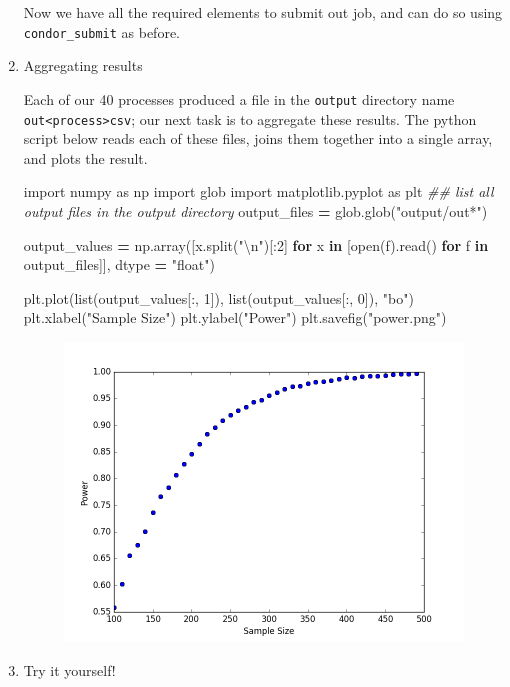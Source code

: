 \documentclass[]{book}
\newenvironment{Shaded}{\begin{snugshade}}{\end{snugshade}}
\newcommand{\KeywordTok}[1]{\textcolor[rgb]{0.13,0.29,0.53}{\textbf{#1}}}
\newcommand{\DecValTok}[1]{\textcolor[rgb]{0.00,0.00,0.81}{#1}}
\newcommand{\CharTok}[1]{\textcolor[rgb]{0.31,0.60,0.02}{#1}}
\newcommand{\StringTok}[1]{\textcolor[rgb]{0.31,0.60,0.02}{#1}}
\newcommand{\ImportTok}[1]{#1}
\newcommand{\CommentTok}[1]{\textcolor[rgb]{0.56,0.35,0.01}{\textit{#1}}}
\newcommand{\ControlFlowTok}[1]{\textcolor[rgb]{0.13,0.29,0.53}{\textbf{#1}}}
\newcommand{\OperatorTok}[1]{\textcolor[rgb]{0.81,0.36,0.00}{\textbf{#1}}}
\newcommand{\BuiltInTok}[1]{#1}
\newcommand{\NormalTok}[1]{#1}
\begin{document}
\begin{enumerate}
  Now we have all the required elements to submit out job, and can do so
  using \texttt{condor\_submit} as before.
\item
  Aggregating results

  Each of our 40 processes produced a file in the \texttt{output}
  directory name \texttt{out\textless{}process\textgreater{}csv}; our
  next task is to aggregate these results. The python script below reads
  each of these files, joins them together into a single array, and
  plots the result.

\begin{Shaded}
\begin{Highlighting}[]
\ImportTok{import}\NormalTok{ numpy }\ImportTok{as}\NormalTok{ np}
\ImportTok{import}\NormalTok{ glob}
\ImportTok{import}\NormalTok{ matplotlib.pyplot }\ImportTok{as}\NormalTok{ plt}
\CommentTok{## list all output files in the output directory}
\NormalTok{output_files }\OperatorTok{=}\NormalTok{ glob.glob(}\StringTok{"output/out*"}\NormalTok{)}

\NormalTok{output_values }\OperatorTok{=}\NormalTok{ np.array([x.split(}\StringTok{"}\CharTok{\textbackslash{}n}\StringTok{"}\NormalTok{)[:}\DecValTok{2}\NormalTok{]}
                          \ControlFlowTok{for}\NormalTok{ x }\KeywordTok{in}\NormalTok{ [}\BuiltInTok{open}\NormalTok{(f).read() }\ControlFlowTok{for}\NormalTok{ f }\KeywordTok{in}\NormalTok{ output_files]],}
\NormalTok{                         dtype }\OperatorTok{=} \StringTok{"float"}\NormalTok{)}

\NormalTok{plt.plot(}\BuiltInTok{list}\NormalTok{(output_values[:, }\DecValTok{1}\NormalTok{]), }\BuiltInTok{list}\NormalTok{(output_values[:, }\DecValTok{0}\NormalTok{]), }\StringTok{"bo"}\NormalTok{)}
\NormalTok{plt.xlabel(}\StringTok{"Sample Size"}\NormalTok{)}
\NormalTok{plt.ylabel(}\StringTok{"Power"}\NormalTok{)}
\NormalTok{plt.savefig(}\StringTok{"power.png"}\NormalTok{)}
\end{Highlighting}
\end{Shaded}

  \begin{figure}
  \centering
  \includegraphics{images/python_powerDist.png}
  \caption{}
  \end{figure}
\item
  Try it yourself!


\end{enumerate}
\end{document}
